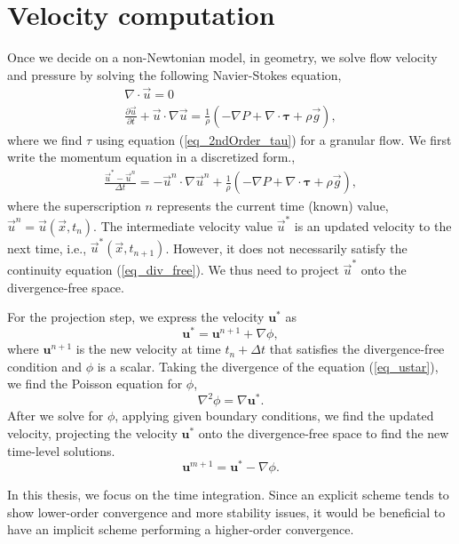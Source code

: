 \section{Velocity computation}
Once we decide on a non-Newtonian model, in geometry, we solve flow velocity and pressure by solving the following Navier-Stokes equation,
\begin{align}
  \nabla \cdot \vec{u} = 0 
  \label{eq_div_free} \\
     \frac{\partial \vec{u}}{\partial t} + \vec{u}\cdot \nabla \vec{u}
= \frac{1}{\rho}
\left(
- \nabla P 
    + \nabla \cdot   \bm{\tau} 
    +  \rho  \vec{g} 
    \right),
  \label{eq_NS_ch4}
  \end{align}
where we find $\tau$ using equation (\ref{eq_2ndOrder_tau}) for a granular flow. 
We first write the momentum equation in a discretized form.,
\begin{align}
     \frac{\vec{u}^* - \vec{u}^n}{\Delta t} 
= 
-\vec{u}^n \cdot \nabla \vec{u}^n 
+\frac{1}{\rho}
\left(
- \nabla P 
    + \nabla \cdot   \bm{\tau} 
    +  \rho  \vec{g} 
    \right),
  \end{align}
where the superscription $n$ represents the current time (known) value, $\vec{u}^n = \vec{u}(\vec{x}, t_n)$. The intermediate velocity value $\vec{u}^*$ is an updated velocity to the next time, i.e., $\vec{u}^* (\vec{x}, t_{n+1})$. However, it does not necessarily satisfy the continuity equation (\ref{eq_div_free}). We thus need to project $\vec{u}^*$ onto the divergence-free space. 
\par
For the projection step, we express the velocity ${\bm u}^{*}$ as
\begin{equation}
  {\bm u}^* = {\bm u}^{n+1} + \nabla \phi,
  \label{eq_ustar}
\end{equation}
where ${\bm u}^{n+1}$ is the new velocity at time $t_n + \Delta t$ that satisfies the divergence-free condition and $\phi$ is a scalar.
Taking the divergence of the equation (\ref{eq_ustar}), we find the Poisson equation for $\phi$,
\[
  \nabla^2 \phi = \nabla {\bm u}^*.  
\]
After we solve for $\phi$, applying given boundary conditions, we find the updated velocity, projecting the velocity ${\bm u}^*$ onto the divergence-free space to find the new time-level solutions.
\[
  {\bm u}^{m+1} = {\bm u}^* - \nabla \phi.
\]

In this thesis, we focus on the time integration. 
Since an explicit scheme tends to show lower-order convergence and more stability issues, it would be beneficial to have an implicit scheme performing a higher-order convergence.  
